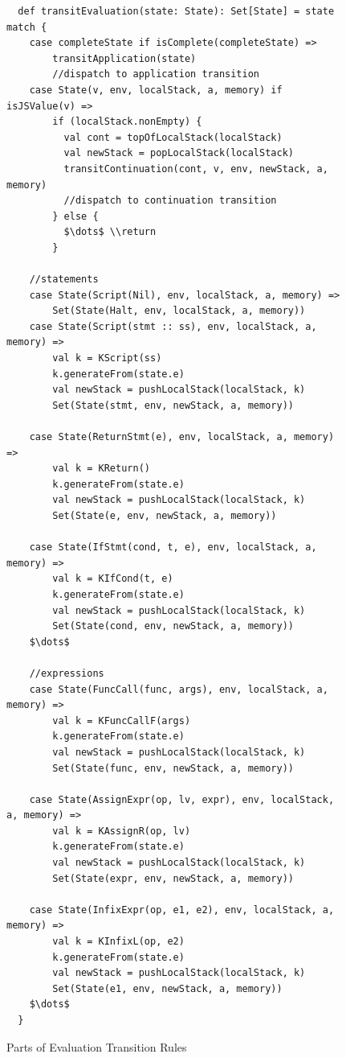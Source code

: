 \documentclass{article}
\begin{document}
\begin{figure}
\lstset{language=Scala, mathescape}
\begin{lstlisting}
  def transitEvaluation(state: State): Set[State] = state match {
    case completeState if isComplete(completeState) =>
        transitApplication(state)
        //dispatch to application transition
    case State(v, env, localStack, a, memory) if isJSValue(v) =>
        if (localStack.nonEmpty) {
          val cont = topOfLocalStack(localStack)
          val newStack = popLocalStack(localStack)
          transitContinuation(cont, v, env, newStack, a, memory)
          //dispatch to continuation transition
        } else {
          $\dots$ \\return
        }

    //statements
    case State(Script(Nil), env, localStack, a, memory) =>
        Set(State(Halt, env, localStack, a, memory))
    case State(Script(stmt :: ss), env, localStack, a, memory) =>
        val k = KScript(ss)
        k.generateFrom(state.e)
        val newStack = pushLocalStack(localStack, k)
        Set(State(stmt, env, newStack, a, memory))

    case State(ReturnStmt(e), env, localStack, a, memory) =>
        val k = KReturn()
        k.generateFrom(state.e)
        val newStack = pushLocalStack(localStack, k)
        Set(State(e, env, newStack, a, memory))

    case State(IfStmt(cond, t, e), env, localStack, a, memory) =>
        val k = KIfCond(t, e)
        k.generateFrom(state.e)
        val newStack = pushLocalStack(localStack, k)
        Set(State(cond, env, newStack, a, memory))
    $\dots$

    //expressions
    case State(FuncCall(func, args), env, localStack, a, memory) =>
        val k = KFuncCallF(args)
        k.generateFrom(state.e)
        val newStack = pushLocalStack(localStack, k)
        Set(State(func, env, newStack, a, memory))

    case State(AssignExpr(op, lv, expr), env, localStack, a, memory) =>
        val k = KAssignR(op, lv)
        k.generateFrom(state.e)
        val newStack = pushLocalStack(localStack, k)
        Set(State(expr, env, newStack, a, memory))

    case State(InfixExpr(op, e1, e2), env, localStack, a, memory) =>
        val k = KInfixL(op, e2)
        k.generateFrom(state.e)
        val newStack = pushLocalStack(localStack, k)
        Set(State(e1, env, newStack, a, memory))
    $\dots$
  }
\end{lstlisting}
\caption{Parts of Evaluation Transition Rules}
\label{fig:eval}
\end{figure}
\end{document}
